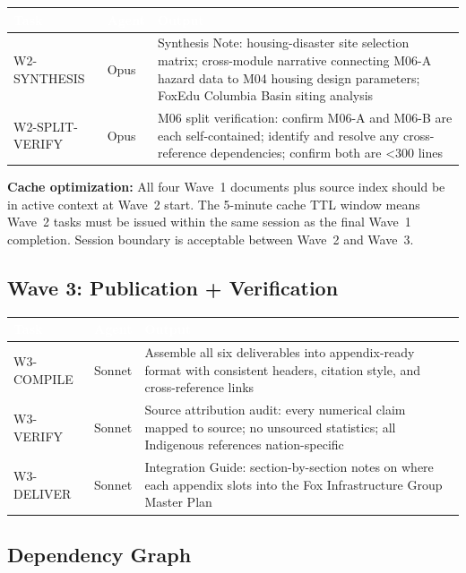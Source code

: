 \documentclass[11pt,letterpaper]{article}
\newcommand{\tableheader}[1]{\textbf{\sffamily\textcolor{white}{#1}}}
\begin{document}
\begin{center}
\begin{tabularx}{\textwidth}{L{2.5cm}L{2cm}X}
\toprule
{}
\tableheader{Task} & \tableheader{Agent} & \tableheader{Output} \\
\midrule
W2-SYNTHESIS & Opus & Synthesis Note: housing-disaster site selection matrix; cross-module narrative connecting M06-A hazard data to M04 housing design parameters; FoxEdu Columbia Basin siting analysis \\
W2-SPLIT-VERIFY & Opus & M06 split verification: confirm M06-A and M06-B are each self-contained; identify and resolve any cross-reference dependencies; confirm both are \textless300 lines \\
\bottomrule
\end{tabularx}
\end{center}

\textbf{Cache optimization:} All four Wave~1 documents plus source index should be in active context at Wave~2 start. The 5-minute cache TTL window means Wave~2 tasks must be issued within the same session as the final Wave~1 completion. Session boundary is acceptable between Wave~2 and Wave~3.

\subsection{Wave 3: Publication + Verification}

\begin{center}
\begin{tabularx}{\textwidth}{L{2.5cm}L{2cm}X}
\toprule
{}
\tableheader{Task} & \tableheader{Agent} & \tableheader{Output} \\
\midrule
W3-COMPILE & Sonnet & Assemble all six deliverables into appendix-ready format with consistent headers, citation style, and cross-reference links \\
W3-VERIFY & Sonnet & Source attribution audit: every numerical claim mapped to source; no unsourced statistics; all Indigenous references nation-specific \\
W3-DELIVER & Sonnet & Integration Guide: section-by-section notes on where each appendix slots into the Fox Infrastructure Group Master Plan \\
\bottomrule
\end{tabularx}
\end{center}

\subsection{Dependency Graph}
\end{document}
